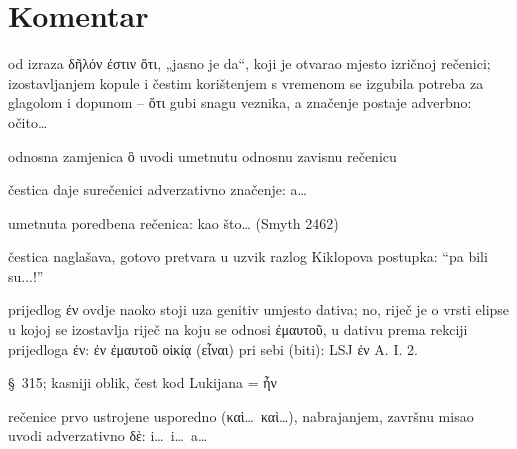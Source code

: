 \section*{Komentar}


\begin{description}[noitemsep]
\item[δῆλον ὅτι] od izraza δῆλόν ἐστιν ὅτι, „jasno je da“, koji je otvarao mjesto izričnoj rečenici; izostavljanjem kopule i čestim korištenjem s vremenom se izgubila potreba za glagolom i dopunom – ὅτι gubi snagu veznika, a značenje postaje adverbno: očito\dots
\item[ὃ ἔφερον] odnosna zamjenica ὃ uvodi umetnutu odnosnu zavisnu rečenicu
\item[δὲ] čestica daje surečenici adverzativno značenje: a…
\item[ὥσπερ εἰκὸς ἦν] umetnuta poredbena rečenica: kao što… (Smyth 2462)
\item[γε] čestica naglašava, gotovo pretvara u uzvik razlog Kiklopova postupka: ``pa bili su...!''
\end{description}


\begin{description}[noitemsep]
\item[ἐν ἐμαυτοῦ] prijedlog ἐν ovdje naoko stoji uza genitiv umjesto dativa; no, riječ je o vrsti elipse u kojoj se izostavlja riječ na koju se odnosi ἐμαυτοῦ, u dativu prema rekciji prijedloga ἐν: ἐν ἐμαυτοῦ οἰκίᾳ (εἶναι) pri sebi (biti): LSJ ἐν A. I. 2. 
\item[ἤμην] §~315; kasniji oblik, čest kod Lukijana = ἦν
\item[καὶ… καὶ… δὲ\dots] rečenice prvo ustrojene usporedno (καὶ\dots\ καὶ\dots), nabrajanjem, završnu misao uvodi adverzativno δὲ: i\dots\ i\dots\ a\dots

\end{description}



